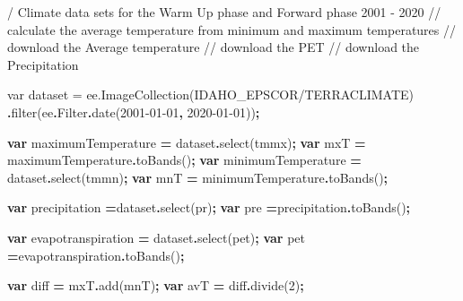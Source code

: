 \documentclass[
  10pt,
  b5paper,
]{book}
\newenvironment{Shaded}{\begin{snugshade}}{\end{snugshade}}
\newcommand{\AttributeTok}[1]{\textcolor[rgb]{0.77,0.63,0.00}{#1}}
\newcommand{\DecValTok}[1]{\textcolor[rgb]{0.00,0.00,0.81}{#1}}
\newcommand{\FunctionTok}[1]{\textcolor[rgb]{0.00,0.00,0.00}{#1}}
\newcommand{\KeywordTok}[1]{\textcolor[rgb]{0.13,0.29,0.53}{\textbf{#1}}}
\newcommand{\NormalTok}[1]{#1}
\newcommand{\OperatorTok}[1]{\textcolor[rgb]{0.81,0.36,0.00}{\textbf{#1}}}
\newcommand{\SpecialCharTok}[1]{\textcolor[rgb]{0.00,0.00,0.00}{#1}}
\newcommand{\SpecialStringTok}[1]{\textcolor[rgb]{0.31,0.60,0.02}{#1}}
\newcommand{\StringTok}[1]{\textcolor[rgb]{0.31,0.60,0.02}{#1}}
\begin{document}
\begin{Shaded}
\begin{Highlighting}[]
\SpecialStringTok{/ Climate data sets for the Warm Up phase and Forward phase 2001 {-} 2020}
\SpecialStringTok{// calculate the average temperature from minimum and maximum temperatures}
\SpecialStringTok{// download the Average temperature}
\SpecialStringTok{// download the PET }
\SpecialStringTok{// download the Precipitation}

\SpecialStringTok{var dataset = ee.ImageCollection}\SpecialCharTok{(}\SpecialStringTok{\textquotesingle{}IDAHO\_EPSCOR/TERRACLIMATE}\StringTok{\textquotesingle{})}
                  \OperatorTok{.}\FunctionTok{filter}\NormalTok{(ee}\OperatorTok{.}\AttributeTok{Filter}\OperatorTok{.}\FunctionTok{date}\NormalTok{(}\StringTok{\textquotesingle{}2001{-}01{-}01\textquotesingle{}}\OperatorTok{,} \StringTok{\textquotesingle{}2020{-}01{-}01\textquotesingle{}}\NormalTok{))}\OperatorTok{;}

\KeywordTok{var}\NormalTok{ maximumTemperature }\OperatorTok{=}\NormalTok{ dataset}\OperatorTok{.}\FunctionTok{select}\NormalTok{(}\StringTok{\textquotesingle{}tmmx\textquotesingle{}}\NormalTok{)}\OperatorTok{;}
\KeywordTok{var}\NormalTok{ mxT }\OperatorTok{=}\NormalTok{ maximumTemperature}\OperatorTok{.}\FunctionTok{toBands}\NormalTok{()}\OperatorTok{;}
\KeywordTok{var}\NormalTok{ minimumTemperature }\OperatorTok{=}\NormalTok{ dataset}\OperatorTok{.}\FunctionTok{select}\NormalTok{(}\StringTok{\textquotesingle{}tmmn\textquotesingle{}}\NormalTok{)}\OperatorTok{;}
\KeywordTok{var}\NormalTok{ mnT }\OperatorTok{=}\NormalTok{ minimumTemperature}\OperatorTok{.}\FunctionTok{toBands}\NormalTok{()}\OperatorTok{;}

\KeywordTok{var}\NormalTok{ precipitation }\OperatorTok{=}\NormalTok{dataset}\OperatorTok{.}\FunctionTok{select}\NormalTok{(}\StringTok{\textquotesingle{}pr\textquotesingle{}}\NormalTok{)}\OperatorTok{;}
\KeywordTok{var}\NormalTok{ pre }\OperatorTok{=}\NormalTok{precipitation}\OperatorTok{.}\FunctionTok{toBands}\NormalTok{()}\OperatorTok{;}

\KeywordTok{var}\NormalTok{ evapotranspiration }\OperatorTok{=}\NormalTok{ dataset}\OperatorTok{.}\FunctionTok{select}\NormalTok{(}\StringTok{\textquotesingle{}pet\textquotesingle{}}\NormalTok{)}\OperatorTok{;}
\KeywordTok{var}\NormalTok{ pet }\OperatorTok{=}\NormalTok{evapotranspiration}\OperatorTok{.}\FunctionTok{toBands}\NormalTok{()}\OperatorTok{;}

\KeywordTok{var}\NormalTok{ diff }\OperatorTok{=}\NormalTok{ mxT}\OperatorTok{.}\FunctionTok{add}\NormalTok{(mnT)}\OperatorTok{;}
\KeywordTok{var}\NormalTok{ avT }\OperatorTok{=}\NormalTok{ diff}\OperatorTok{.}\FunctionTok{divide}\NormalTok{(}\DecValTok{2}\NormalTok{)}\OperatorTok{;}


\end{Highlighting}
\end{Shaded}
\end{document}

